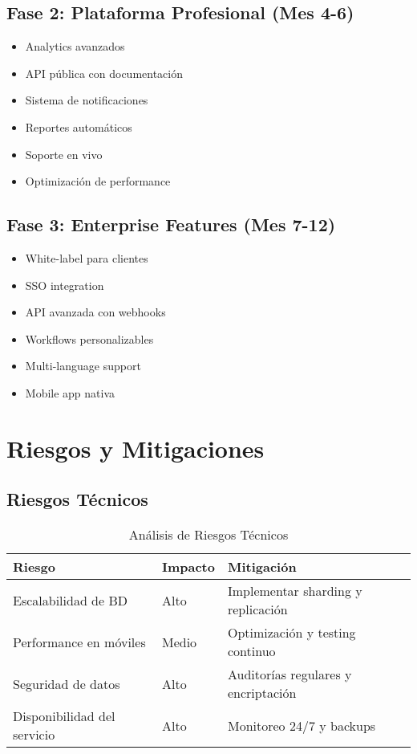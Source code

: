 \documentclass[12pt,a4paper]{article}
\begin{document}
\subsection{Fase 2: Plataforma Profesional (Mes 4-6)}
\begin{itemize}
    \item [ ] Analytics avanzados
    \item [ ] API pública con documentación
    \item [ ] Sistema de notificaciones
    \item [ ] Reportes automáticos
    \item [ ] Soporte en vivo
    \item [ ] Optimización de performance
\end{itemize}

\subsection{Fase 3: Enterprise Features (Mes 7-12)}
\begin{itemize}
    \item [ ] White-label para clientes
    \item [ ] SSO integration
    \item [ ] API avanzada con webhooks
    \item [ ] Workflows personalizables
    \item [ ] Multi-language support
    \item [ ] Mobile app nativa
\end{itemize}

\section{Riesgos y Mitigaciones}

\subsection{Riesgos Técnicos}
\begin{table}[h]
\centering
\begin{tabular}{|l|l|l|}
\hline
\textbf{Riesgo} & \textbf{Impacto} & \textbf{Mitigación} \\
\hline
Escalabilidad de BD & Alto & Implementar sharding y replicación \\
Performance en móviles & Medio & Optimización y testing continuo \\
Seguridad de datos & Alto & Auditorías regulares y encriptación \\
Disponibilidad del servicio & Alto & Monitoreo 24/7 y backups \\
\hline
\end{tabular}
\caption{Análisis de Riesgos Técnicos}
\end{table}
\end{document}
